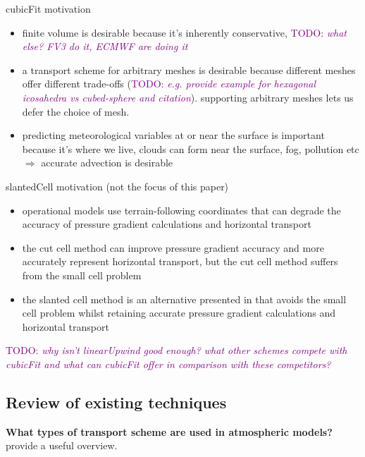 \documentclass[times]{elsarticle}
\newcommand{\TODO}[1]{\textcolor{purple}{TODO: \emph{#1}}}
\begin{document}
cubicFit motivation
\begin{itemize}
	\item finite volume is desirable because it's inherently conservative, \TODO{what else?  FV3 do it, ECMWF are doing it}
	\item a transport scheme for arbitrary meshes is desirable because different meshes offer different trade-offs (\TODO{e.g. provide example for hexagonal icosahedra vs cubed-sphere and citation}).  supporting arbitrary meshes lets us defer the choice of mesh.
	\item predicting meteorological variables at or near the surface is important because it's where we live, clouds can form near the surface, fog, pollution etc $\Rightarrow$ accurate advection is desirable
\end{itemize}

slantedCell motivation (not the focus of this paper)
\begin{itemize}
	\item operational models use terrain-following coordinates that can degrade the accuracy of pressure gradient calculations and horizontal transport
	\item the cut cell method can improve pressure gradient accuracy and more accurately represent horizontal transport, but the cut cell method suffers from the small cell problem
	\item the slanted cell method is an alternative presented in \citep{shaw-weller2016} that avoids the small cell problem whilst retaining accurate pressure gradient calculations and horizontal transport
\end{itemize}


\TODO{why isn't linearUpwind good enough?  what other schemes compete with cubicFit and what can cubicFit offer in comparison with these competitors?}

\subsection{Review of existing techniques}
\textbf{What types of transport scheme are used in atmospheric models?} \\
\citep{lauritzen2014} provide a useful overview.
\end{document}
